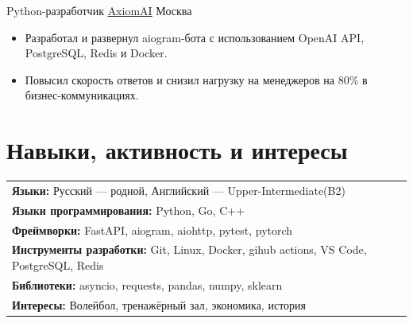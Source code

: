 \documentclass[11pt,a4paper,sans]{moderncv}
\begin{document}
{Python-разработчик}
{\href{https://github.com/noobmaster-ru/axiomai}{AxiomAI}}
{Москва}{}{
\vspace{3pt}
\begin{itemize}
    \item Разработал и развернул aiogram-бота с использованием OpenAI API, PostgreSQL, Redis и Docker.
    \item Повысил скорость ответов и снизил нагрузку на менеджеров на 80\% в бизнес-коммуникациях.
\end{itemize}
}


\section{Навыки, активность и интересы}
\noindent
\begin{tabularx}{\textwidth}{@{}l X@{}}
\textbf{Языки:} Русский --- родной, Английский --- Upper-Intermediate(B2) \\
\textbf{Языки программирования:} Python, Go, C++ \\
\textbf{Фреймворки:} FastAPI, aiogram, aiohttp, pytest, pytorch \\
\textbf{Инструменты разработки:} Git, Linux, Docker, gihub actions, VS Code, PostgreSQL, Redis \\
\textbf{Библиотеки:} asyncio, requests, pandas, numpy, sklearn \\
\textbf{Интересы:} Волейбол, тренажёрный зал, экономика, история \\
\end{tabularx}
\end{document}
